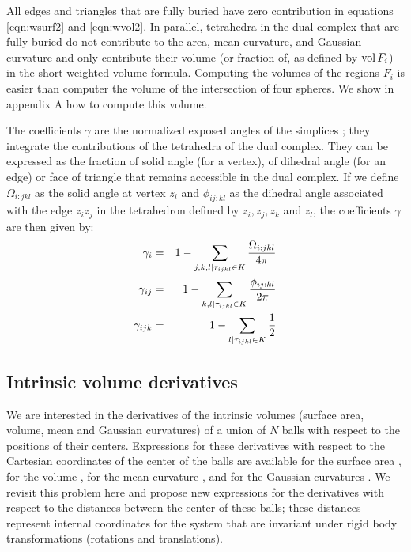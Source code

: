 \documentclass[11 pt]{article}
\newcommand {\mm}[1] {\ifmmode{#1}\else{\mbox{\(#1\)}}\fi}
\theoremstyle{plain} \theorembodyfont{\rmfamily}
\newcommand{\tsx}           {\mm{\tau}}
\newcommand{\Volume}[1]     {\mm{\rm vol\,}{#1}}
\begin{document}
All edges and triangles that are fully buried have zero contribution in equations \ref{eqn:wsurf2} and \ref{eqn:wvol2}. In parallel, tetrahedra in the dual complex that are fully buried do not contribute to the area, mean curvature, and Gaussian curvature and only contribute their volume (or fraction of, as defined by $\Volume{F_i}$) in the short weighted volume formula. 
Computing the volumes of the regions $F_i$ is easier than computer the volume of the intersection of four spheres. We show in appendix A how to compute this volume.

The coefficients $\gamma$ are the normalized exposed angles of the simplices \cite{EdKo05}; they integrate the contributions of the tetrahedra of the dual complex.
They can be expressed as the fraction of solid angle (for a vertex), of dihedral angle (for an edge) or face of triangle that remains accessible in the dual complex.
If we define $\Omega_{i:jkl}$ as the solid angle at vertex $z_i$ and $\phi_{ij; kl}$ as the dihedral angle associated with the edge $z_iz_j$ in the tetrahedron defined by $z_i, z_j, z_k$ and $z_l$, the coefficients $\gamma$ are then given by:
 \begin{eqnarray}
 \gamma_i &=& 1 - \sum_{j,k,l \mid \tsx_{ijkl} \in K} \frac{\Omega_{i:jkl}}{4\pi} \\
 \gamma_{ij} &=& 1 - \sum_{k,l \mid \tsx_{ijkl} \in K} \frac{\phi_{ij:kl}}{2\pi} \\
 \label{eqn:gammaij}
 \gamma_{ijk} &=& 1 - \sum_{l \mid \tsx_{ijkl} \in K} \frac{1}{2}
 \label{eqn:gammaijk}
 \end{eqnarray}
  
\subsection{Intrinsic volume derivatives}

We are interested in the derivatives of the intrinsic volumes (surface area, volume, mean and Gaussian curvatures) of a union
of $N$ balls with respect to the positions of their centers.
Expressions for these derivatives with respect to the Cartesian coordinates of the center of the balls are available for the surface area \cite{BEKL04}, for the volume \cite{EdKo03}, for the mean curvature \cite{AkEd19a}, and for the Gaussian curvatures \cite{AkEd19b}.  
We revisit this problem here and propose new expressions for the derivatives with respect to the distances between the center of these balls; these distances represent internal coordinates for the system that are invariant under rigid body transformations (rotations and translations).
\end{document}
